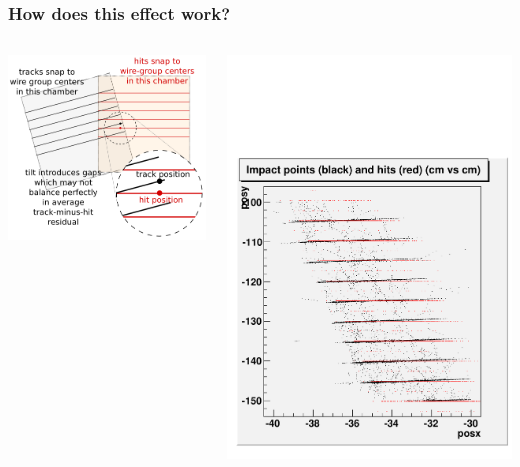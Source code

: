 \documentclass[compress]{beamer}
\begin{document}
\begin{frame}
\frametitle{How does this effect work?}

\begin{columns}
\includegraphics[width=\linewidth]{vertical_residual.png}

\includegraphics[width=\linewidth]{selectioneffect_nocut.pdf}


\end{columns}
\end{frame}
\end{document}

